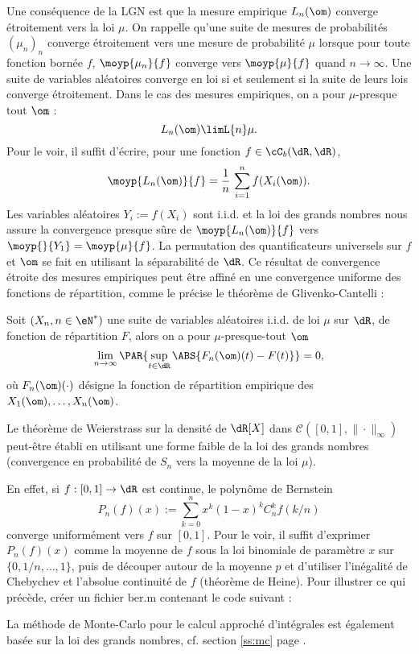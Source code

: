 Une conséquence de la LGN est que la mesure empirique $L_n(\om)$ converge
étroitement vers la loi $\mu$. On rappelle qu'une suite de mesures de
probabilités $(\mu_n)_n$ converge étroitement vers une mesure de probabilité
$\mu$ lorsque pour toute fonction bornée $f$, $\moyp{\mu_n}{f}$ converge vers
$\moyp{\mu}{f}$ quand $n\to\infty$.  Une suite de variables aléatoires converge
en loi si et seulement si la suite de leurs lois converge étroitement. Dans le
cas des mesures empiriques, on a pour $\mu$-presque tout $\om$ :
$$
L_n(\om)\limL{n}\mu.
$$
Pour le voir, il suffit d'écrire, pour une fonction $f\in\cC_b(\dR,\dR)$,
$$
\moyp{L_n(\om)}{f}=\frac{1}{n}\,\sum_{i=1}^n f(X_i(\om)).
$$
Les variables aléatoires $Y_i:=f(X_i)$ sont i.i.d. et la loi des grands
nombres nous assure la convergence presque sûre de $\moyp{L_n(\om)}{f}$ vers
$\moyp{}{Y_1}=\moyp{\mu}{f}$. La permutation des quantificateurs universels sur
$f$ et $\om$ se fait en utilisant la séparabilité de $\dR$. Ce résultat de
convergence étroite des mesures empiriques peut être affiné en une convergence
uniforme des fonctions de répartition, comme le précise le théorème de
Glivenko-Cantelli :

\begin{theorem}\label{th:gc}
  Soit $(X_n,n\in\eN^*)$ une suite de variables aléatoires i.i.d. de loi $\mu$
  sur $\dR$, de fonction de répartition $F$, alors on a pour
  $\mu$-presque-tout $\om$
 \begin{equation}\label{eq:gc} 
 \lim_{n\to\infty} \PAR{\sup_{t \in \dR} \ABS{F_n(\om)(t)-F(t)}} = 0, 
\end{equation}
où $F_n(\om)(\cdot)$ désigne la fonction de répartition empirique des
$X_1(\om),\ldots,X_n(\om)$.
\end{theorem}

\begin{exo}
  
  Le théorème de Weierstrass sur la densité de $\dR[X]$ dans
  $\mathcal{C}([0,1],\|\cdot\|_\infty)$ peut-être établi en utilisant une
  forme faible de la loi des grands nombres (convergence en probabilité de
  $S_n$ vers la moyenne de la loi $\mu$).
  
  En effet, si $f:[0,1]\to \dR$ est continue, le polynôme de Bernstein
  $$
  P_n(f)(x):=\sum_{k=0}^n x^k(1-x)^kC_n^k f(k/n)
  $$
  converge uniformément vers $f$ sur $[0,1]$. Pour le voir, il suffit
  d'exprimer $P_n(f)(x)$ comme la moyenne de $f$ sous la loi binomiale de
  paramètre $x$ sur $\{0,1/n,\ldots,1\}$, puis de découper autour de la
  moyenne $p$ et d'utiliser l'inégalité de Chebychev et l'absolue continuité
  de $f$ (théorème de Heine).  Pour illustrer ce qui précède, créer un fichier
  \textsf{ber.m} contenant le code suivant :
\end{exo}
La méthode de Monte-Carlo pour le calcul approché d'intégrales est également
basée sur la loi des grands nombres, cf. section \ref{ss:mc} page
\pageref{ss:mc}.

